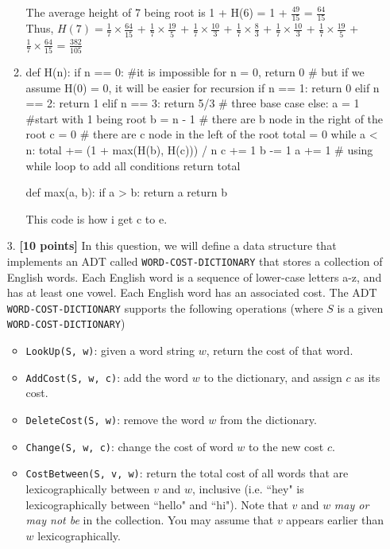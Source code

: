 \documentclass{assignment-263}
\begin{document}
\begin{enumerate}
\begin{enumerate}
      The average height of 7 being root is 1 + H(6) = 1 + $\frac{49}{15}$ = $\frac{64}{15}$ \\
      Thus, $H(7) = \frac{1}{7} \times \frac{64}{15} $ + $\frac{1}{7} \times \frac{19}{5} $ + $\frac{1}{7} \times \frac{10}{3}$ +  $\frac{1}{7} \times \frac{8}{3}$ + $\frac{1}{7} \times \frac{10}{3}$ + $\frac{1}{7} \times \frac{19}{5} $ + $\frac{1}{7} \times \frac{64}{15} $ = $\frac{382}{105}$
  \item
\begin{python}
def H(n):
  if n == 0:   #it is impossible for n = 0,
   return 0    # but if we assume H(0) = 0, it will be easier for recursion
  if n == 1:
   return 0
  elif n == 2:
   return 1
  elif n == 3:
   return 5/3  # three base case
  else:
   a = 1       #start with 1 being root
   b = n - 1   # there are b node in the right of the root
   c = 0       # there are c node in the left of the root
   total = 0
   while a < n:
     total += (1 + max(H(b), H(c))) / n
     c += 1
     b -= 1
     a += 1    # using while loop to add all conditions
   return total

def max(a, b):
   if a > b:
    return a
   return b
\end{python}
This code is how i get c to e.
\end{enumerate}


\item[3.] \textbf{[10 points]} In this question, we will define a data structure that implements an ADT called
\verb|WORD-COST-DICTIONARY| that stores a collection of English words.
Each English word is a sequence of lower-case letters a-z, and has at least one vowel. 
Each English word has an associated cost. 
The ADT \verb|WORD-COST-DICTIONARY| supports the following operations
(where $S$ is a given \verb|WORD-COST-DICTIONARY|)

\begin{itemize}
    \item \verb|LookUp(S, w)|: given a word string $w$, return the cost of that word.
    \item \verb|AddCost(S, w, c)|: add the word $w$ to the dictionary, and assign $c$ as its cost.
    \item \verb|DeleteCost(S, w)|: remove the word $w$ from the dictionary.
    \item \verb|Change(S, w, c)|: change the cost of word $w$ to the new cost $c$.
    \item \verb|CostBetween(S, v, w)|: return the total cost of all words that are
        lexicographically between $v$ and $w$, inclusive
        (i.e. ``hey" is lexicographically between ``hello" and ``hi").
        Note that $v$ and $w$ \textit{may or may not be} in the collection.
        You may assume that $v$ appears earlier than $w$ lexicographically.
\end{itemize}


\end{enumerate}
\end{document}

